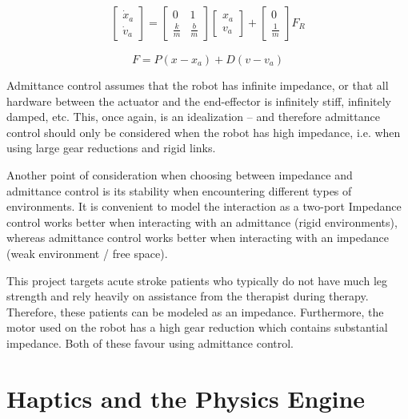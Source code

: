 \documentclass[12pt]{report}
\begin{document}
	\begin{gather} \label{eqn:adm}
	\begin{bmatrix}
    	\dot{x}_a \\
    	\dot{v}_a 
    \end{bmatrix} 
    =
    \begin{bmatrix}
    	0 & 1 \\
    	\frac{k}{m} & \frac{b}{m}
    \end{bmatrix} 
    \begin{bmatrix}
    	x_a \\
    	v_a
    \end{bmatrix}  
    +
    \begin{bmatrix}
    	0 \\
    	\frac{1}{m}
    \end{bmatrix}
    F_R   	
	\end{gather}
	
	\begin{equation} \label{eqn:PD}
	F = P(x - x_a) + D(v - v_a)
	\end{equation}

	Admittance control assumes that the robot has infinite impedance, or that all hardware between the actuator and the end-effector is infinitely stiff, infinitely damped, etc. This, once again, is an idealization -- and therefore admittance control should only be considered when the robot has high impedance, i.e. when using large gear reductions and rigid links. 
	
	Another point of consideration when choosing between impedance and admittance control is its stability when encountering different types of environments. It is convenient to model the interaction as a two-port
	Impedance control works better when interacting with an admittance (rigid environments), whereas admittance control works better when interacting with an impedance (weak environment / free space). 
	
	This project targets acute stroke patients who typically do not have much leg strength and rely heavily on assistance from the therapist during therapy. Therefore, these patients can be modeled as an impedance. Furthermore, the motor used on the robot has a high gear reduction which contains substantial impedance. Both of these favour using admittance control. 
	
	

	\section{Haptics and the Physics Engine}
%
\end{document}
